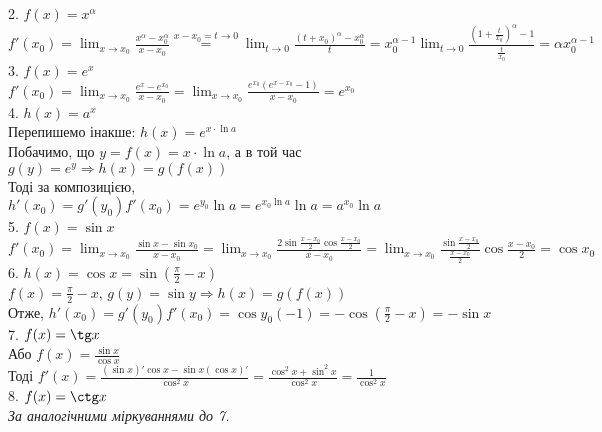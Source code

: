\documentclass[a4paper, 14pt]{article}
\theoremstyle{theoremdd}
\theoremstyle{theoremdd}
\theoremstyle{theoremdd}
\theoremstyle{theoremdd}
\theoremstyle{theoremdd}
\theoremstyle{theoremdd}
\theoremstyle{theoremdd}
\theoremstyle{theoremdd}
\begin{document}
2. $f(x) = x^{\alpha}$\\
$f'(x_0) = \displaystyle \lim_{x \to x_0} \frac{x^{\alpha} - x_0^{\alpha}}{x-x_0} \overset{x-x_0 = t \to 0}{=} \lim_{t \to 0} \frac{(t+x_0)^{\alpha} - x_0^{\alpha}}{t} = x_0^{\alpha-1} \lim_{t \to 0} \frac{\left(1 + \frac{t}{x_0}\right)^{\alpha} - 1}{\frac{t}{x_0}} = \alpha x_0^{\alpha-1}$
\bigskip \\

3. $f(x) = e^x$\\
$f'(x_0) = \displaystyle \lim_{x \to x_0} \frac{e^x-e^{x_0}}{x-x_0} = \lim_{x \to x_0} \frac{e^{x_0}(e^{x-x_0}-1)}{x-x_0} = e^{x_0}$
\bigskip \\

4. $h(x) = a^x$\\
Перепишемо інакше: $h(x) = e^{x \cdot \ln a}$\\
Побачимо, що $y = f(x) = x \cdot \ln a$, а в той час $g(y) = e^y \Rightarrow h(x)=g(f(x))$\\
Тоді за композицією, $h'(x_0) = g'(y_0) f'(x_0) = e^{y_0} \ln a = e^{x_0 \ln a} \ln a = a^{x_0} \ln a$
\bigskip \\

5. $f(x) = \sin x$\\
$f'(x_0) = \displaystyle \lim_{x \to x_0} \frac{\sin x - \sin x_0}{x-x_0} = \lim_{x \to x_0} \frac{2 \sin \frac{x-x_0}{2} \cos \frac{x-x_0}{2}}{x-x_0} = \lim_{x \to x_0} \frac{\sin \frac{x-x_0}{2}}{\frac{x-x_0}{2}} \cos \frac{x-x_0}{2} = \cos x_0$
\bigskip \\

6. $h(x) = \displaystyle \cos x = \sin \left(\frac{\pi}{2} - x \right)$\\
$f(x) = \displaystyle \frac{\pi}{2} - x$, $g(y) = \sin y \Rightarrow h(x) = g(f(x))$\\
Отже, $h'(x_0) = g'(y_0)f'(x_0) = \cos y_0 (-1) = \displaystyle -\cos \left(\frac{\pi}{2} - x \right) = -\sin x$
\bigskip \\

7. $f(x) = \tg x$\\
Або $f(x) = \displaystyle \frac{\sin x}{\cos x}$\\
Тоді $f'(x) = \displaystyle \frac{(\sin x)' \cos x - \sin x (\cos x)'}{\cos^2 x} = \frac{\cos^2 x + \sin^2x}{\cos^2 x} = \frac{1}{\cos^2 x}$
\bigskip \\

8. $f(x) = \ctg x$\\
\textit{За аналогічними міркуваннями до 7.}
\bigskip \\
\end{document}
